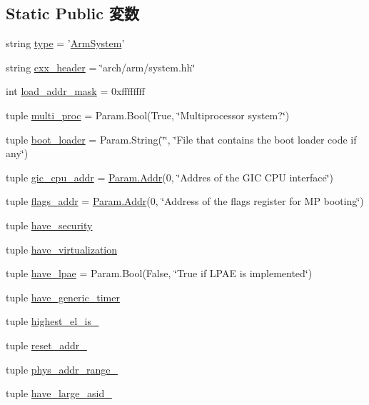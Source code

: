 \subsection*{Static Public 変数}
\begin{DoxyCompactItemize}
\item 
string \hyperlink{classArmSystem_1_1ArmSystem_acce15679d830831b0bbe8ebc2a60b2ca}{type} = '\hyperlink{classArmSystem_1_1ArmSystem}{ArmSystem}'
\item 
string \hyperlink{classArmSystem_1_1ArmSystem_a17da7064bc5c518791f0c891eff05fda}{cxx\_\-header} = \char`\"{}arch/arm/system.hh\char`\"{}
\item 
int \hyperlink{classArmSystem_1_1ArmSystem_abd9c5cc6b7da624a69344d571bab1038}{load\_\-addr\_\-mask} = 0xffffffff
\item 
tuple \hyperlink{classArmSystem_1_1ArmSystem_a406eef435fa7bd49bc7c48deba06068a}{multi\_\-proc} = Param.Bool(True, \char`\"{}Multiprocessor system?\char`\"{})
\item 
tuple \hyperlink{classArmSystem_1_1ArmSystem_a241024b500742afa82dcb8edf653cd4c}{boot\_\-loader} = Param.String(\char`\"{}\char`\"{}, \char`\"{}File that contains the boot loader code if any\char`\"{})
\item 
tuple \hyperlink{classArmSystem_1_1ArmSystem_af795cc7110a0a7211a9b262851de4a36}{gic\_\-cpu\_\-addr} = \hyperlink{base_2types_8hh_af1bb03d6a4ee096394a6749f0a169232}{Param.Addr}(0, \char`\"{}Addres of the GIC CPU interface\char`\"{})
\item 
tuple \hyperlink{classArmSystem_1_1ArmSystem_a4cede061071acf32525d725eea7f8436}{flags\_\-addr} = \hyperlink{base_2types_8hh_af1bb03d6a4ee096394a6749f0a169232}{Param.Addr}(0, \char`\"{}Address of the flags register for MP booting\char`\"{})
\item 
tuple \hyperlink{classArmSystem_1_1ArmSystem_a6978e1e6ec4cd09819bff5ea47e48f73}{have\_\-security}
\item 
tuple \hyperlink{classArmSystem_1_1ArmSystem_af99d2b8d0234cd2104e8e2cd8a592d7f}{have\_\-virtualization}
\item 
tuple \hyperlink{classArmSystem_1_1ArmSystem_a2761f8fe489eb1f50380273e54f85b04}{have\_\-lpae} = Param.Bool(False, \char`\"{}True if LPAE is implemented\char`\"{})
\item 
tuple \hyperlink{classArmSystem_1_1ArmSystem_a305b42a51f701d2a5f6e3724d33ee37b}{have\_\-generic\_\-timer}
\item 
tuple \hyperlink{classArmSystem_1_1ArmSystem_a4be10756962c1bcc437a2110f0c0fe80}{highest\_\-el\_\-is\_}
\item 
tuple \hyperlink{classArmSystem_1_1ArmSystem_a35ec37e4cfef612ea6ab758b446c80de}{reset\_\-addr\_}
\item 
tuple \hyperlink{classArmSystem_1_1ArmSystem_a5d15b93d3810eb55745bb4d63895a4e6}{phys\_\-addr\_\-range\_}
\item 
tuple \hyperlink{classArmSystem_1_1ArmSystem_a82887e1e3de3c3e0d28910b1604ab61a}{have\_\-large\_\-asid\_}
\end{DoxyCompactItemize}


